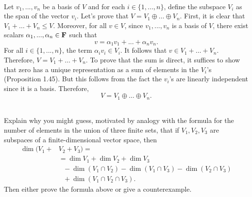 \begin{solution}
    \\ Let $v_1, ..., v_n$ be a basis of $V$ and for each $i \in \{1, ..., n\}$, define the subspace $V_i$ as the span of the vector $v_i$. Let's prove that $V = V_1 \oplus \dots \oplus V_n.$ First, it is clear that $V_1 + \dots + V_n \leq V$. Moreover, for all $v \in V$, since $v_1, ..., v_n$ is a basis of $V$, there exist scalars $\alpha_1, ..., \alpha_n \in \mathbf{F}$ such that
    $$v = \alpha_1 v_1 + ... + \alpha_n v_n.$$
    For all $i \in \{1, ..., n\}$, the term $\alpha_i v_i \in V_i$. It follows that $v \in V_1 + \dots + V_n$. Therefore, $V = V_1 + \dots + V_n$. To prove that the sum is direct, it suffices to show that zero has a unique representation as a sum of elements in the $V_i$'s (Proposition 1.45). But this follows from the fact the $v_i$'s are linearly independent since it is a basis. Therefore,
    $$V = V_1 \oplus \dots \oplus V_n.$$ \\
\end{solution}

\begin{exercise}
    Explain why you might guess, motivated by analogy with the formula for the number of elements in the union of three finite sets, that if $V_1, V_2, V_3$ are subspaces of a finite-dimensional vector space, then 
    \begin{align*}
        \dim(V_1 + &V_2 + V_3) = \\
        &= \dim V_1 + \dim V_2 + \dim V_3 \\
        & \ \ \ - \dim(V_1 \cap V_2) - \dim(V_1 \cap V_3) - \dim(V_2 \cap V_3) \\
        & \ \ \ + \dim(V_1 \cap V_2 \cap V_3).
    \end{align*}
    Then either prove the formula above or give a counterexample. \\
\end{exercise}

